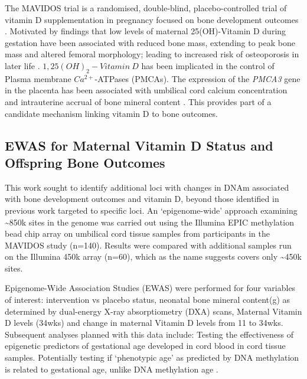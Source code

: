 \documentclass[]{book}
\begin{document}
The MAVIDOS trial is a randomised, double-blind, placebo-controlled trial of vitamin D supplementation in pregnancy focused on bone development outcomes \citep[\citet{Cooper2016}]{Harvey2012a}. Motivated by findings that low levels of maternal 25(OH)-Vitamin D during gestation have been associated with reduced bone mass, extending to peak bone mass \citep{Zhu2014a} and altered femoral morphology; leading to increased risk of osteoporosis in later life \citep[\citet{Viljakainen2010},\citet{Viljakainen2011}]{Mahon2010a}. \(1,25(OH)_2-Vitamin~D\) has been implicated in the control of Plasma membrane \(Ca^{2+}\)-ATPases (PMCAs). The expression of the \emph{PMCA3} gene in the placenta has been associated with umbilical cord calcium concentration and intrauterine accrual of bone mineral content \citep{Kip2004}. This provides part of a candidate mechanism linking vitamin D to bone outcomes.

\hypertarget{ewas-for-maternal-vitamin-d-status-and-offspring-bone-outcomes}{%
\subsection{EWAS for Maternal Vitamin D Status and Offspring Bone Outcomes}\label{ewas-for-maternal-vitamin-d-status-and-offspring-bone-outcomes}}

This work sought to identify additional loci with changes in DNAm associated with bone development outcomes and vitamin D, beyond those identified in previous work targeted to specific loci. An `epigenome-wide' approach examining \textasciitilde850k sites in the genome was carried out using the Illumina EPIC methylation bead chip array on umbilical cord tissue samples from participants in the MAVIDOS study (n=140). Results were compared with additional samples run on the Illumina 450k array (n=60), which as the name suggests covers only \textasciitilde450k sites.

Epigenome-Wide Association Studies (EWAS) were performed for four variables of interest: intervention vs placebo status, neonatal bone mineral content(g) as determined by dual-energy X-ray absorptiometry (DXA) scans, Maternal Vitamin D levels (34wks) and change in maternal Vitamin D levels from 11 to 34wks. Subsequent analyses planned with this data include: Testing the effectiveness of epigenetic predictors of gestational age developed in cord blood \citep[\citet{Knight2016}]{Bohlin2016} in cord tissue samples. Potentially testing if `phenotypic age' as predicted by DNA methylation \citep{Levine2018} is related to gestational age, unlike DNA methylation age \citep[\citet{Simpkin2017}]{Simpkin2016}.
\end{document}
